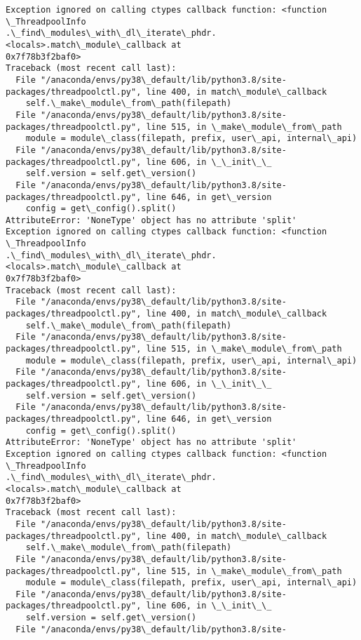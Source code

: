 \documentclass[11pt]{article}
\begin{document}
\begin{Verbatim}[commandchars=\\\{\}]
Exception ignored on calling ctypes callback function: <function \_ThreadpoolInfo
.\_find\_modules\_with\_dl\_iterate\_phdr.<locals>.match\_module\_callback at
0x7f78b3f2baf0>
Traceback (most recent call last):
  File "/anaconda/envs/py38\_default/lib/python3.8/site-
packages/threadpoolctl.py", line 400, in match\_module\_callback
    self.\_make\_module\_from\_path(filepath)
  File "/anaconda/envs/py38\_default/lib/python3.8/site-
packages/threadpoolctl.py", line 515, in \_make\_module\_from\_path
    module = module\_class(filepath, prefix, user\_api, internal\_api)
  File "/anaconda/envs/py38\_default/lib/python3.8/site-
packages/threadpoolctl.py", line 606, in \_\_init\_\_
    self.version = self.get\_version()
  File "/anaconda/envs/py38\_default/lib/python3.8/site-
packages/threadpoolctl.py", line 646, in get\_version
    config = get\_config().split()
AttributeError: 'NoneType' object has no attribute 'split'
Exception ignored on calling ctypes callback function: <function \_ThreadpoolInfo
.\_find\_modules\_with\_dl\_iterate\_phdr.<locals>.match\_module\_callback at
0x7f78b3f2baf0>
Traceback (most recent call last):
  File "/anaconda/envs/py38\_default/lib/python3.8/site-
packages/threadpoolctl.py", line 400, in match\_module\_callback
    self.\_make\_module\_from\_path(filepath)
  File "/anaconda/envs/py38\_default/lib/python3.8/site-
packages/threadpoolctl.py", line 515, in \_make\_module\_from\_path
    module = module\_class(filepath, prefix, user\_api, internal\_api)
  File "/anaconda/envs/py38\_default/lib/python3.8/site-
packages/threadpoolctl.py", line 606, in \_\_init\_\_
    self.version = self.get\_version()
  File "/anaconda/envs/py38\_default/lib/python3.8/site-
packages/threadpoolctl.py", line 646, in get\_version
    config = get\_config().split()
AttributeError: 'NoneType' object has no attribute 'split'
Exception ignored on calling ctypes callback function: <function \_ThreadpoolInfo
.\_find\_modules\_with\_dl\_iterate\_phdr.<locals>.match\_module\_callback at
0x7f78b3f2baf0>
Traceback (most recent call last):
  File "/anaconda/envs/py38\_default/lib/python3.8/site-
packages/threadpoolctl.py", line 400, in match\_module\_callback
    self.\_make\_module\_from\_path(filepath)
  File "/anaconda/envs/py38\_default/lib/python3.8/site-
packages/threadpoolctl.py", line 515, in \_make\_module\_from\_path
    module = module\_class(filepath, prefix, user\_api, internal\_api)
  File "/anaconda/envs/py38\_default/lib/python3.8/site-
packages/threadpoolctl.py", line 606, in \_\_init\_\_
    self.version = self.get\_version()
  File "/anaconda/envs/py38\_default/lib/python3.8/site-

\end{Verbatim}
\end{document}
